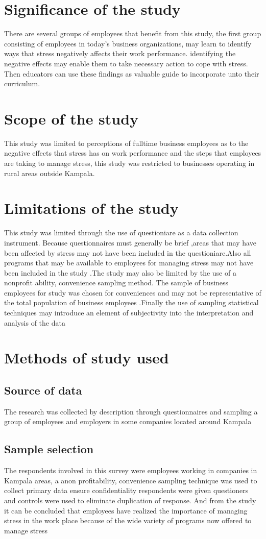 \documentclass[10pt,]{article}
\begin{document}
\section{Significance of the study}
There are several groups of employees that benefit from this study, the first group consisting of employees in today’s business organizations, may learn to identify ways that stress negatively affects their work performance. identifying the negative effects may enable them to take necessary action to cope with stress. Then educators can use these findings as valuable guide to incorporate unto their curriculum.
\section{Scope of the study}
This study was limited to perceptions of fulltime business employees as to the negative effects that stress has on work performance and the steps that employees are taking to manage stress, this study was restricted to businesses operating in rural areas outside Kampala.
\section{Limitations of the study}
This study was limited through the use of questioniare as a data collection instrument. Because questionnaires must generally be brief ,areas that may have been affected by stress may not have been included in the questioniare.Also all programs that may be available to employees for managing stress may not have been included in the study .The study may also be limited by the use of a nonprofit ability, convenience sampling method. 
The sample of business employees for study was chosen for conveniences and may not be representative of the total population of business employees .Finally the use of sampling statistical techniques may introduce an element of subjectivity into the interpretation and analysis of the data
\section{Methods of study used }
 \subsection{Source of data }
The research was collected by description through questionnaires and sampling a group of employees and employers in some companies located around Kampala
 \subsection{Sample selection }
The respondents involved in this survey were employees working in companies in Kampala areas, a anon profitability, convenience sampling technique was used to collect primary data ensure confidentiality respondents were given questioners and controls were used to eliminate duplication of response. And from the study it can be concluded that employees have realized the importance of managing stress in the work place because of the wide variety of programs now offered to manage stress
\end{document}
